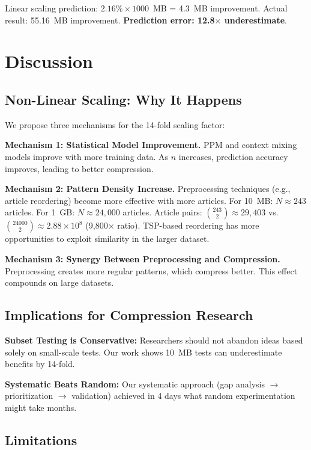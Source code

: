 \documentclass[conference]{IEEEtran}
\begin{document}
Linear scaling prediction: $2.16\% \times 1000$~MB = 4.3~MB improvement. Actual result: 55.16~MB improvement. \textbf{Prediction error: 12.8$\times$ underestimate}.

\section{Discussion}

\subsection{Non-Linear Scaling: Why It Happens}

We propose three mechanisms for the 14-fold scaling factor:

\textbf{Mechanism 1: Statistical Model Improvement.} PPM and context mixing models improve with more training data. As $n$ increases, prediction accuracy improves, leading to better compression.

\textbf{Mechanism 2: Pattern Density Increase.} Preprocessing techniques (e.g., article reordering) become more effective with more articles. For 10~MB: $N \approx 243$ articles. For 1~GB: $N \approx 24,000$ articles. Article pairs: $\binom{243}{2} \approx 29,403$ vs. $\binom{24000}{2} \approx 2.88 \times 10^8$ (9,800$\times$ ratio). TSP-based reordering has more opportunities to exploit similarity in the larger dataset.

\textbf{Mechanism 3: Synergy Between Preprocessing and Compression.} Preprocessing creates more regular patterns, which compress better. This effect compounds on large datasets.

\subsection{Implications for Compression Research}

\textbf{Subset Testing is Conservative:} Researchers should not abandon ideas based solely on small-scale tests. Our work shows 10~MB tests can underestimate benefits by 14-fold.

\textbf{Systematic Beats Random:} Our systematic approach (gap analysis $\rightarrow$ prioritization $\rightarrow$ validation) achieved in 4 days what random experimentation might take months.

\subsection{Limitations}
\end{document}
